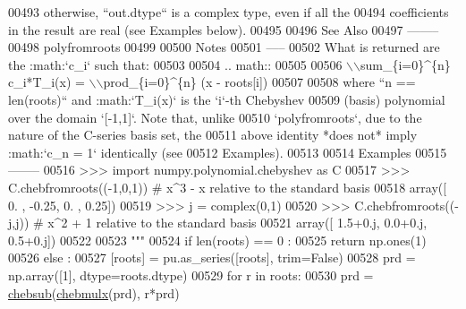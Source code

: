 \begin{DoxyCode}
00493 \textcolor{stringliteral}{        otherwise, ``out.dtype`` is a complex type, even if all the}
00494 \textcolor{stringliteral}{        coefficients in the result are real (see Examples below).}
00495 \textcolor{stringliteral}{}
00496 \textcolor{stringliteral}{    See Also}
00497 \textcolor{stringliteral}{    --------}
00498 \textcolor{stringliteral}{    polyfromroots}
00499 \textcolor{stringliteral}{}
00500 \textcolor{stringliteral}{    Notes}
00501 \textcolor{stringliteral}{    -----}
00502 \textcolor{stringliteral}{    What is returned are the :math:`c\_i` such that:}
00503 \textcolor{stringliteral}{}
00504 \textcolor{stringliteral}{    .. math::}
00505 \textcolor{stringliteral}{}
00506 \textcolor{stringliteral}{        \(\backslash\)\(\backslash\)sum\_\{i=0\}^\{n\} c\_i*T\_i(x) = \(\backslash\)\(\backslash\)prod\_\{i=0\}^\{n\} (x - roots[i])}
00507 \textcolor{stringliteral}{}
00508 \textcolor{stringliteral}{    where ``n == len(roots)`` and :math:`T\_i(x)` is the `i`-th Chebyshev}
00509 \textcolor{stringliteral}{    (basis) polynomial over the domain `[-1,1]`.  Note that, unlike}
00510 \textcolor{stringliteral}{    `polyfromroots`, due to the nature of the C-series basis set, the}
00511 \textcolor{stringliteral}{    above identity *does not* imply :math:`c\_n = 1` identically (see}
00512 \textcolor{stringliteral}{    Examples).}
00513 \textcolor{stringliteral}{}
00514 \textcolor{stringliteral}{    Examples}
00515 \textcolor{stringliteral}{    --------}
00516 \textcolor{stringliteral}{    >>> import numpy.polynomial.chebyshev as C}
00517 \textcolor{stringliteral}{    >>> C.chebfromroots((-1,0,1)) # x^3 - x relative to the standard basis}
00518 \textcolor{stringliteral}{    array([ 0.  , -0.25,  0.  ,  0.25])}
00519 \textcolor{stringliteral}{    >>> j = complex(0,1)}
00520 \textcolor{stringliteral}{    >>> C.chebfromroots((-j,j)) # x^2 + 1 relative to the standard basis}
00521 \textcolor{stringliteral}{    array([ 1.5+0.j,  0.0+0.j,  0.5+0.j])}
00522 \textcolor{stringliteral}{}
00523 \textcolor{stringliteral}{    """}
00524     \textcolor{keywordflow}{if} len(roots) == 0 :
00525         \textcolor{keywordflow}{return} np.ones(1)
00526     \textcolor{keywordflow}{else} :
00527         [roots] = pu.as\_series([roots], trim=\textcolor{keyword}{False})
00528         prd = np.array([1], dtype=roots.dtype)
00529         \textcolor{keywordflow}{for} r \textcolor{keywordflow}{in} roots:
00530             prd = \hyperlink{namespacepyneb_1_1utils_1_1chebyshev_ac07c70b217882a8c0a731ce9fdf743f0}{chebsub}(\hyperlink{namespacepyneb_1_1utils_1_1chebyshev_ab09f8accee50bd964e03071a659a7b5f}{chebmulx}(prd), r*prd)

\end{DoxyCode}
